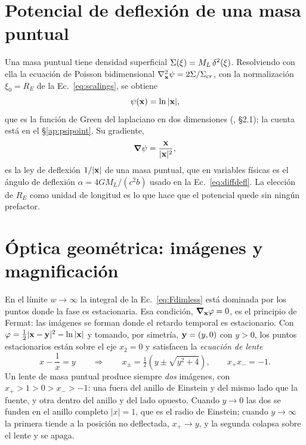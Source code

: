 \documentclass[11pt,a4paper,openany]{book}
\begin{document}
\section{Potencial de deflexi\'on de una masa puntual}
\label{sec:psi_point}

Una masa puntual tiene densidad superficial
$\Sigma(\vb\xi)=M_L\,\delta^{2}(\vb\xi)$. Resolviendo con ella la ecuaci\'on
de Poisson bidimensional $\nabla^{2}_{\vb x}\psi=2\Sigma/\Sigma_{cr}$, con la
normalizaci\'on $\xi_0=R_E$ de la Ec.~\eqref{eq:scalings}, se obtiene
\begin{equation}
  \psi(\vb x)=\ln|\vb x| ,
  \label{eq:psi_point}
\end{equation}
que es la funci\'on de Green del laplaciano en dos dimensiones
(\citealp{Takahashi2003}, \S2.1); la cuenta est\'a en el \S\ref{ap:psipoint}.
Su gradiente,
\begin{equation}
  \grad\psi=\frac{\vb x}{|\vb x|^{2}} ,
  \label{eq:defl_point}
\end{equation}
es la ley de deflexi\'on $1/|\vb x|$ de una masa puntual, que en variables
f\'isicas es el \'angulo de deflexi\'on $\alpha=4GM_L/(c^{2}b)$ usado en la
Ec.~\eqref{eq:diffdefl}. La elecci\'on de $R_E$ como unidad de longitud es lo
que hace que el potencial quede sin ning\'un prefactor.

\section{\'Optica geom\'etrica: im\'agenes y magnificaci\'on}
\label{sec:geo}

En el l\'imite $w\to\infty$ la integral de la Ec.~\eqref{eq:Fdimless} est\'a
dominada por los puntos donde la fase es estacionaria. Esa condici\'on,
$\grad_{\vb x}\varphi=0$, es el principio de Fermat: las im\'agenes se forman
donde el retardo temporal es estacionario. Con
$\varphi=\tfrac12|\vb x-\vb y|^{2}-\ln|\vb x|$ y tomando, por simetr\'ia,
$\vb y=(y,0)$ con $y>0$, los puntos estacionarios est\'an sobre el eje
$x_2=0$ y satisfacen la \emph{ecuaci\'on de lente}
\begin{equation}
  x-\frac{1}{x}=y
  \qquad\Longrightarrow\qquad
  x_\pm=\tfrac12\left(y\pm\sqrt{y^{2}+4}\right),
  \qquad x_+x_-=-1 .
  \label{eq:images}
\end{equation}
Un lente de masa puntual produce siempre \emph{dos} im\'agenes, con
$x_+>1>0>x_->-1$: una fuera del anillo de Einstein y del mismo lado que la
fuente, y otra dentro del anillo y del lado opuesto. Cuando $y\to0$ las dos se
funden en el anillo completo $|x|=1$, que es el radio de Einstein; cuando
$y\to\infty$ la primera tiende a la posici\'on no deflectada, $x_+\to y$, y la
segunda colapsa sobre el lente y se apaga.
\end{document}
